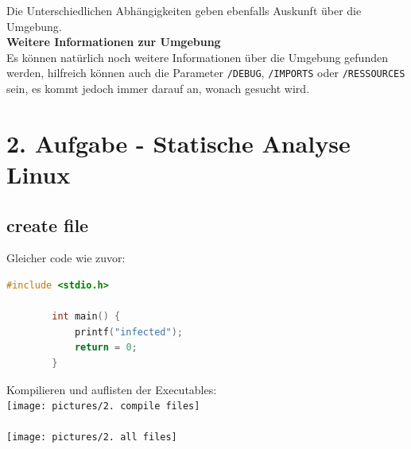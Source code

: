 \documentclass{article}
\begin{document}
\begin{enumerate}
		Die Unterschiedlichen Abhängigkeiten geben ebenfalls Auskunft über die Umgebung.\\
		
		\noindent \textbf{Weitere Informationen zur Umgebung}\\
		Es können natürlich noch weitere Informationen über die Umgebung gefunden werden, hilfreich können auch die Parameter \texttt{/DEBUG}, \texttt{/IMPORTS} oder \texttt{/RESSOURCES} sein, es kommt jedoch immer darauf an, wonach gesucht wird.\\
	\end{enumerate}
		
	\pagebreak
	
	\section*{2. Aufgabe - Statische Analyse Linux}
	\subsection*{create file}
	Gleicher code wie zuvor:\\
	\begin{lstlisting}[language=c]
		#include <stdio.h>
		
		int main() {
			printf("infected");
			return = 0;
		}
	\end{lstlisting}
	Kompilieren und auflisten der Executables:\\
	\texttt{[image: pictures/2. compile files]}\\
	\\
	\texttt{[image: pictures/2. all files]}\\
	
\end{document}
